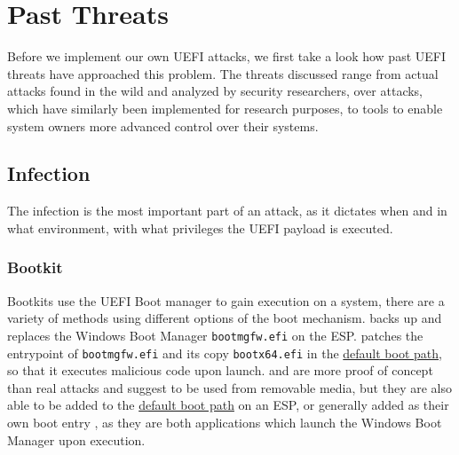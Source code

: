
\chapter{Past Threats}


Before we implement our own \ac{UEFI} attacks, we first take a look how past \ac{UEFI} threats have approached this problem.
The threats discussed range from actual attacks found in the wild and analyzed by security researchers, over attacks, which have similarly been implemented for research purposes, to tools to enable system owners more advanced control over their systems.

\section{Infection}

The infection is the most important part of an attack, as it dictates when and in what environment, with what privileges the \ac{UEFI} payload is executed.

\subsection{Bootkit}

Bootkits use the \ac{UEFI} Boot manager to gain execution on a system, there are a variety of methods using different options of the boot mechanism.
\cite{finspy} backs up and replaces the Windows Boot Manager \lstinline{bootmgfw.efi} on the \ac{ESP}. \cite{especter} patches the entrypoint of \lstinline{bootmgfw.efi} and its copy \lstinline{bootx64.efi} in the \hyperref[sec:uefi-pi:uefi:boot-manager]{default boot path}, so that it executes malicious code upon launch.
\cite{dreamboot} and \cite{efiguard} are more proof of concept than real attacks and suggest to be used from removable media, but they are also able to be added to the \hyperref[sec:uefi-pi:uefi:boot-manager]{default boot path} on an \ac{ESP}, or generally added as their own boot entry \cite{efiguard}, as they are both applications which launch the Windows Boot Manager upon execution.
